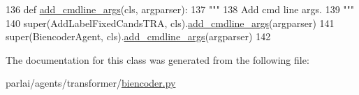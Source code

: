 \begin{DoxyCode}
136     \textcolor{keyword}{def }\hyperlink{namespaceparlai_1_1agents_1_1drqa_1_1config_a62fdd5554f1da6be0cba185271058320}{add\_cmdline\_args}(cls, argparser):
137         \textcolor{stringliteral}{"""}
138 \textcolor{stringliteral}{        Add cmd line args.}
139 \textcolor{stringliteral}{        """}
140         super(AddLabelFixedCandsTRA, cls).\hyperlink{namespaceparlai_1_1agents_1_1drqa_1_1config_a62fdd5554f1da6be0cba185271058320}{add\_cmdline\_args}(argparser)
141         super(BiencoderAgent, cls).\hyperlink{namespaceparlai_1_1agents_1_1drqa_1_1config_a62fdd5554f1da6be0cba185271058320}{add\_cmdline\_args}(argparser)
142 \end{DoxyCode}


The documentation for this class was generated from the following file\+:\begin{DoxyCompactItemize}
\item 
parlai/agents/transformer/\hyperlink{biencoder_8py}{biencoder.\+py}\end{DoxyCompactItemize}
